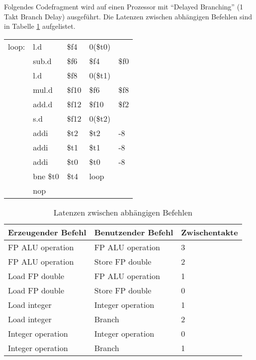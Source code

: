 Folgendes Codefragment wird auf einen Prozessor mit "`Delayed Branching"' (1 Takt Branch Delay) ausgeführt. Die Latenzen zwischen abhängigen Befehlen sind in Tabelle \ref{tbl:stalls1} aufgelistet.

{
	\ttfamily
	\begin{tabular}{l llll}
		loop: & l.d      & \$f4  & 0(\$t0) &      \\
		      & sub.d    & \$f6  & \$f4    & \$f0 \\
		      & l.d      & \$f8  & 0(\$t1) &      \\
		      & mul.d    & \$f10 & \$f6    & \$f8 \\
		      & add.d    & \$f12 & \$f10   & \$f2 \\
		      & s.d      & \$f12 & 0(\$t2) &      \\
		      & addi     & \$t2  & \$t2    & -8   \\
		      & addi     & \$t1  & \$t1    & -8   \\
		      & addi     & \$t0  & \$t0    & -8   \\
		      & bne \$t0 & \$t4  & loop    &      \\
		      & nop      &       &         &
	\end{tabular}
}

\begin{table}[h!]
	\centering
	\begin{tabular}{lll}
		\hline
		Erzeugender Befehl & Benutzender Befehl & Zwischentakte \\ \hline
		FP ALU operation   & FP ALU operation   & 3             \\
		FP ALU operation   & Store FP double    & 2             \\
		Load FP double     & FP ALU operation   & 1             \\
		Load FP double     & Store FP double    & 0             \\
		Load integer       & Integer operation  & 1             \\
		Load integer       & Branch             & 2             \\
		Integer operation  & Integer operation  & 0             \\
		Integer operation  & Branch             & 1             \\ \hline
	\end{tabular}
	\caption{Latenzen zwischen abhängigen Befehlen}
	\label{tbl:stalls1}
\end{table}